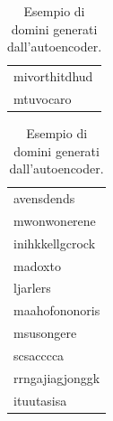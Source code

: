 \begin{table}[htbp]
\begin{tabular}{l}
mivorthitdhud \\
mtuvocaro \\
	\bottomrule
	\end{tabular}
	\begin{tabular}{l}
	\toprule
avensdends \\
mwonwonerene \\
inihkkellgcrock \\
madoxto \\
ljarlers \\
maahofononoris \\
msusongere \\
scsacccca \\
rrngajiagjonggk \\
ituutasisa \\
	\bottomrule
	\end{tabular}

\caption{Esempio di domini generati dall'autoencoder. \label{tab:autoenc}}
\end{table}